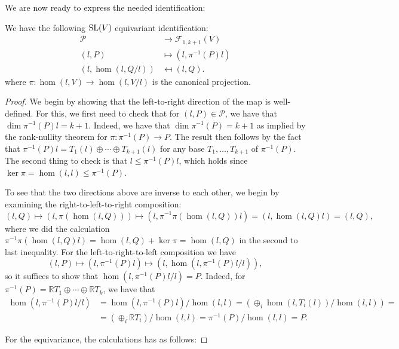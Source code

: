 \documentclass{report}
\begin{document}
We are now ready to express the needed identification:
\begin{proposition}\label{prop:grassmanian_tangent_flags}
We have the following $\operatorname{{\mathrm{SL}}}(V)$ equivariant identification:
\begin{align*}
    \mathcal P &\to \mathcal F_{1, k+1}(V)\\
    (l, P) &\mapsto (l, \pi^{-1}(P)l)\\
    (l, \hom(l, Q/l)) &\mapsfrom (l, Q).
\end{align*}
where $\pi : \hom(l, V) \to \hom(l, V/l)$ is the canonical projection.
\end{proposition}
\begin{proof}
    We begin by showing that the left-to-right direction of the map is well-defined.
    For this, we first need to check that for $(l,P) \in \mathcal P$, we have that $\dim \pi^{-1}(P)l = k + 1$.
    Indeed, we have that $\dim \pi^{-1}(P) = k+1$ as implied by the rank-nullity theorem for $\pi: \pi^{-1}(P) \to P$.
    The result then follows by the fact that $\pi^{-1}(P)l = T_1(l) \oplus \cdots \oplus T_{k+1}(l)$ for any base $T_1, \ldots, T_{k+1}$ of $\pi^{-1}(P)$.
    The second thing to check is that $ l \leq \pi^{-1}(P)l$, which holds since $\ker \pi = \hom(l,l) \leq \pi^{-1}(P)$.

    To see that the two directions above are inverse to each other, we begin by examining the right-to-left-to-right composition:
    \[
    (l, Q) \mapsto (l, \pi(\hom(l, Q))) \mapsto (l, \pi^{-1}\pi(\hom(l, Q))l) = (l, \hom(l, Q)l) = (l, Q),
    \]
    where we did the calculation $\pi^{-1}\pi(\hom(l, Q)l) =  \hom(l,Q) + \ker \pi = \hom(l,Q)$ in the second to last inequality. 
    For the left-to-right-to-left composition we have
    \[
        (l, P) \mapsto (l, \pi^{-1}(P)l) \mapsto (l, \hom(l, \pi^{-1}(P)l/l)),
    \]
    so it suffices to show that $\hom(l, \pi^{-1}(P)l/l) = P$.
    Indeed, for $\pi^{-1}(P) = \mathbb R T_1 \oplus \cdots \oplus \mathbb R T_k$, we have that
    \begin{align*}
        \hom(l, \pi^{-1}(P)l/l) &=
        \hom(l, \pi^{-1}(P)l)/\hom(l,l) =
        \left( \oplus_i \hom(l, T_i(l))/\hom(l,l)\right) =\\
        &= \left(\oplus_i \mathbb R T_i\right)/\hom(l,l) 
        = \pi^{-1}(P)/\hom(l,l) = P.
    \end{align*}

    For the equivariance, the calculations has as follows:

\end{proof}





\printindex
\printbibliography
\end{document}
